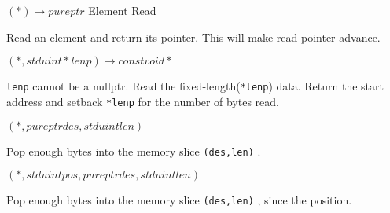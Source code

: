 $(*) \rightarrow pureptr$ Element Read

Read an element and return its pointer.
This will make read pointer advance.

$(*, stduint* lenp) \rightarrow const void*$ 

\verb`lenp` cannot be a nullptr.
Read the fixed-length(\verb|*lenp|) data.
Return the start address and setback \verb|*lenp| for the number of bytes read.

$(*, pureptr des, stduint len)$

Pop enough bytes into the memory slice \verb`(des,len)` .

$(*, stduint pos, pureptr des, stduint len)$

Pop enough bytes into the memory slice \verb`(des,len)` , 
since the position.


